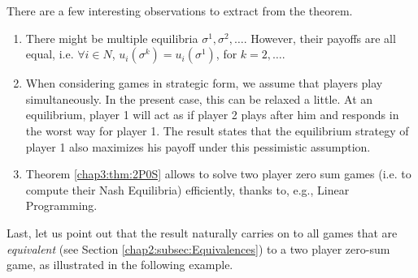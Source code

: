There are a few interesting observations to extract from the theorem.
\begin{enumerate}
\item There might be multiple equilibria $\sigma^1, \sigma^2, \ldots$. However, their payoffs are all equal, i.e. $\forall i \in N$, $u_i(\sigma^k) = u_i(\sigma^1)$, for $k = 2, \ldots$.
\item When considering games in strategic form, we assume that players play simultaneously. In the present case, this can be relaxed a little. At an equilibrium, player 1 will act as if player 2 plays after him and responds in the worst way for player 1. The result states that the equilibrium strategy of player 1 also maximizes his payoff under this pessimistic assumption.
\item Theorem \ref{chap3:thm:2P0S} allows to solve two player zero sum games (i.e. to compute their Nash Equilibria) efficiently, thanks to, e.g., Linear Programming.
\end{enumerate}
\label{chap:NE}

Last, let us point out that the result naturally 
carries on to all games that are \emph{equivalent} (see Section \ref{chap2:subsec:Equivalences}) to a two player zero-sum game, as illustrated in the following example.


